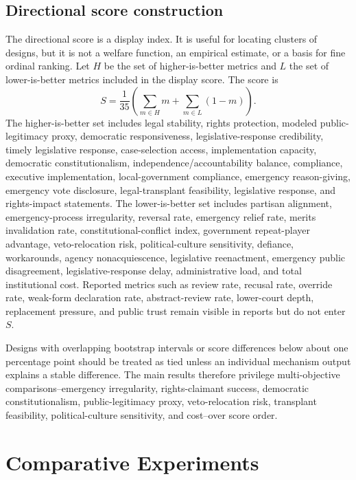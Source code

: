 \documentclass[
  journal=small,
  manuscript=research-article,
  year=2026
]{cup-journal}
\begin{document}
\subsection{Directional score construction}

The directional score is a display index. It is useful for locating clusters of designs, but it is not a welfare function, an empirical estimate, or a basis for fine ordinal ranking. Let $H$ be the set of higher-is-better metrics and $L$ the set of lower-is-better metrics included in the display score. The score is
\[
S=\frac{1}{35}\left(\sum_{m\in H}m+\sum_{m\in L}(1-m)\right).
\]
The higher-is-better set includes legal stability, rights protection, modeled public-legitimacy proxy, democratic responsiveness, legislative-response credibility, timely legislative response, case-selection access, implementation capacity, democratic constitutionalism, independence/accountability balance, compliance, executive implementation, local-government compliance, emergency reason-giving, emergency vote disclosure, legal-transplant feasibility, legislative response, and rights-impact statements. The lower-is-better set includes partisan alignment, emergency-process irregularity, reversal rate, emergency relief rate, merits invalidation rate, constitutional-conflict index, government repeat-player advantage, veto-relocation risk, political-culture sensitivity, defiance, workarounds, agency nonacquiescence, legislative reenactment, emergency public disagreement, legislative-response delay, administrative load, and total institutional cost. Reported metrics such as review rate, recusal rate, override rate, weak-form declaration rate, abstract-review rate, lower-court depth, replacement pressure, and public trust remain visible in reports but do not enter $S$.

Designs with overlapping bootstrap intervals or score differences below about one percentage point should be treated as tied unless an individual mechanism output explains a stable difference. The main results therefore privilege multi-objective comparisons--emergency irregularity, rights-claimant success, democratic constitutionalism, public-legitimacy proxy, veto-relocation risk, transplant feasibility, political-culture sensitivity, and cost--over score order.

\section{Comparative Experiments}
\label{sec:experiments}
\end{document}
